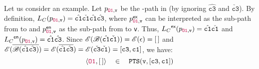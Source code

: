 \begin{comment}
where
\begin{eqnarray}
\label{eq:pt-ctx}
\begin{tabular}{@{}r@{\ }c@{\ }l@{}}
$ctx(\mathcal{L}_C^\entry(p))$ & $\eqdef$ & sequence of unbalanced  $\check{c}$\,'s in\\&& $\overline{\mathcal{L}_C^\entry(p)}$ with their hats elided;\\
$ctx(\mathcal{L}_C^\exit(p))$ & $\eqdef$ & sequence of  unbalanced  $\check{c}$\,'s in\\&&  
$\mathcal{L}_C^\exit(p)$ with their checks elided.
\end{tabular}
\end{eqnarray}
\end{comment}
Let us consider an example.
Let $p_{{\color{purple}\texttt{O1}},\texttt{v}}$ be the \LFC-path in  (by 
ignoring
  $\hat{\boxed{\texttt{c3}}}$
and $\check{\boxed{\texttt{c3}}}$). By definition, 
$\mbox{${L}_C$}(p_{{\color{purple} \texttt{O1}},\texttt{v}})=\hat{\texttt{c1}}\check{\texttt{c1}}\hat{\texttt{c1}}
\hat{\texttt{c3}}$, where
$p_{{\color{purple}\texttt{O1}},\texttt{v}}^\textsf{ex}$ can be interpreted
as the sub-path from  to  and $p_{{\color{purple} \texttt{O1}},\texttt{v}}^\textsf{en}$
as the sub-path from  to \texttt{v}. Thus,
$\mbox{${L}_C$}^\textsf{ex}(p_{{\color{purple}\texttt{O1}},\texttt{v}})  =\hat{\texttt{c1}}\check{\texttt{c1}}$ and $\mbox{${L}_C$}^\textsf{en}(p_{{\color{purple}\texttt{O1}},\texttt{v}})=\hat{\texttt{c1}}
\hat{\texttt{c3}}$. Since
${\mathscr{E}}(\mbox{$\mathscr{B}(\hat{\texttt{c1}}\check{\texttt{c1}})$})
={\mathscr{E}}(\epsilon)=[\,]$ and
${\mathscr{E}}(\overline{\mbox{$\mathscr{B}(\hat{\texttt{c1}}\hat{\texttt{c3}})$}})
=
{\mathscr{E}}(\overline{{\hat{\texttt{c1}}\hat{\texttt{c3}}}})
=
{\mathscr{E}}({{\check{\texttt{c3}}\check{\texttt{c1}}}})
=
[{{{{\texttt{c3}},{\texttt{c1}}}}}]
$, we have:
\begin{equation*}
 \langle {\color{purple}\texttt{O1}},[\,] \rangle\quad \in\quad
\texttt{PTS}(\texttt{v}, [\texttt{c3},\texttt{c1}])
\end{equation*}



